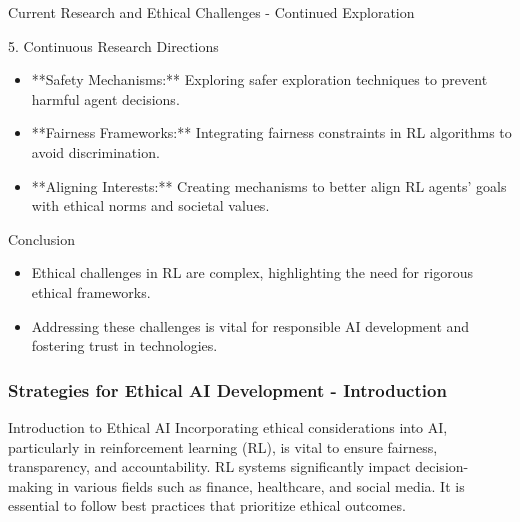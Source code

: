 \documentclass[aspectratio=169]{beamer}
\begin{document}
\begin{frame}[fragile]{Current Research and Ethical Challenges - Continued Exploration}
    \begin{block}{5. Continuous Research Directions}
        \begin{itemize}
            \item **Safety Mechanisms:** Exploring safer exploration techniques to prevent harmful agent decisions.
            \item **Fairness Frameworks:** Integrating fairness constraints in RL algorithms to avoid discrimination.
            \item **Aligning Interests:** Creating mechanisms to better align RL agents' goals with ethical norms and societal values.
        \end{itemize}
    \end{block}
    
    \begin{block}{Conclusion}
        \begin{itemize}
            \item Ethical challenges in RL are complex, highlighting the need for rigorous ethical frameworks.
            \item Addressing these challenges is vital for responsible AI development and fostering trust in technologies.
        \end{itemize}
    \end{block}
\end{frame}

\begin{frame}[fragile]
    \frametitle{Strategies for Ethical AI Development - Introduction}
    \begin{block}{Introduction to Ethical AI}
        Incorporating ethical considerations into AI, particularly in reinforcement learning (RL), is vital to ensure fairness, transparency, and accountability. 
        RL systems significantly impact decision-making in various fields such as finance, healthcare, and social media. 
        It is essential to follow best practices that prioritize ethical outcomes.
    \end{block}
\end{frame}
\end{document}
